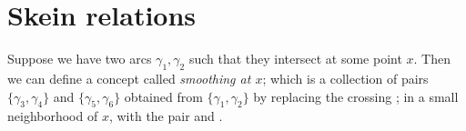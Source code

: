 \section{Skein relations}
Suppose we have two arcs $\gamma_1,\gamma_2$ such that they intersect at some point $x$. Then we can define a concept called \emph{smoothing at $x$}; which is a collection of pairs $\{\gamma_3,\gamma_4\}$ and $\{\gamma_5,\gamma_6\}$ obtained from $\{\gamma_1,\gamma_2\}$ by replacing the crossing \KPB; in a small neighborhood of $x$, with the pair \KPC and \KPD. 
\begin{figure}[H]
    \centering



\begin{tikzpicture}[x=0.75pt,y=0.75pt,yscale=-1,xscale=1]


\end{tikzpicture}
\end{figure}
